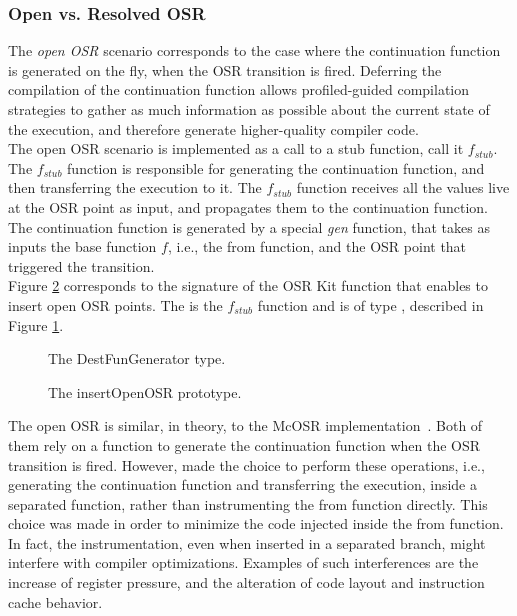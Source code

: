 \subsubsection{Open vs. Resolved OSR}

The \textit{open OSR} scenario corresponds to the case where the continuation function is generated on the fly, when the OSR transition is fired.
Deferring the compilation of the continuation function allows profiled-guided compilation strategies to gather as much information as possible about the current state of the execution, and therefore generate higher-quality compiler code.\\

The open OSR scenario is implemented as a call to a stub function, call it $f_{stub}$.
The $f_{stub}$ function is responsible for generating the continuation function, and then transferring the execution to it.
The $f_{stub}$ function receives all the values live at the OSR point as input, and propagates them to the continuation function.
The continuation function is generated by a special \textit{gen} function, that takes as inputs the base function $f$, i.e., the from function, and the OSR point that triggered the transition.\\

Figure \ref{fig:insertopenosr} corresponds to the signature of the OSR Kit function that enables to insert open OSR points.
The  is the $f_{stub}$ function and is of type , described in Figure \ref{fig:destfungenerator}.\\

\begin{figure}[h]
\caption{The DestFunGenerator type.}
\label{fig:destfungenerator}
\end{figure}

\begin{figure}[h]
\caption{The insertOpenOSR prototype.}
\label{fig:insertopenosr}
\end{figure}

The open OSR is similar, in theory, to the McOSR implementation~\cite{lameed2013modular}.
Both of them rely on a  function to generate the continuation function when the OSR transition is fired.
However,  made the choice to perform these operations, i.e., generating the continuation function and transferring the execution, inside a separated function, rather than instrumenting the from function directly.
This choice was made in order to minimize the code injected inside the from function.
In fact, the instrumentation, even when inserted in a separated branch, might interfere with compiler optimizations.
Examples of such interferences are the increase of register pressure, and the alteration of code layout and instruction cache behavior.\\

